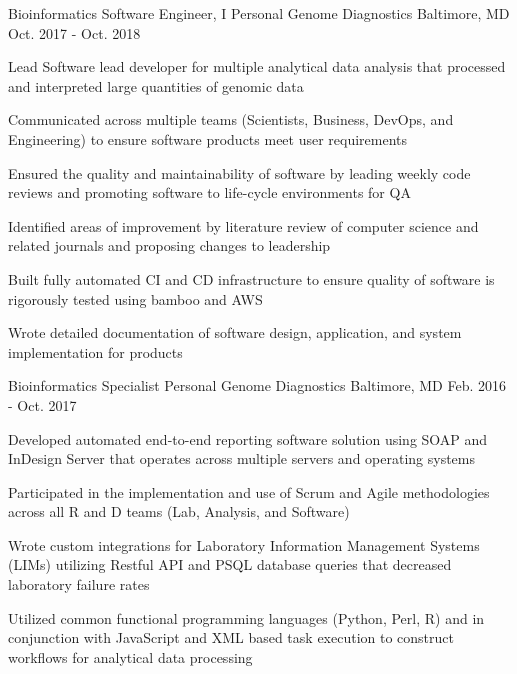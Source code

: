 \begin{cventries}
  \cventry
  {Bioinformatics Software Engineer, I} %
  {Personal Genome Diagnostics} %
  {Baltimore, MD} %
  {Oct. 2017 - Oct. 2018} %
  {
    \begin{cvitems} %
      \item{Lead Software lead developer for multiple analytical data analysis that processed and interpreted large quantities of genomic data}
      \item{Communicated across multiple teams (Scientists, Business, DevOps, and Engineering) to ensure software products meet user requirements}
      \item{Ensured the quality and maintainability of software by leading weekly code reviews and promoting software to life-cycle environments for QA}
      \item{Identified areas of improvement by literature review of computer science and related journals and proposing changes to leadership}
      \item{Built fully automated CI and CD infrastructure to ensure quality of software is rigorously tested using bamboo and AWS }
      \item{Wrote detailed documentation of software design, application, and system implementation for products}
    \end{cvitems}
  }

  \cventry
  {Bioinformatics Specialist} %
  {Personal Genome Diagnostics} %
  {Baltimore, MD} %
  {Feb. 2016 - Oct. 2017} %
  {
    \begin{cvitems} %
      \item{Developed automated end-to-end reporting software solution using SOAP and InDesign Server that operates across multiple servers and operating systems}
      \item{Participated in the implementation and use of Scrum and Agile methodologies across all R and D teams (Lab, Analysis, and Software)}
      \item{Wrote custom integrations for Laboratory Information Management Systems (LIMs) utilizing Restful API and PSQL database queries that decreased laboratory failure rates}
      \item{Utilized common functional programming languages (Python, Perl, R) and in conjunction with JavaScript and XML based task execution to construct workflows for analytical data processing}
    \end{cvitems}
  }


\end{cventries}
